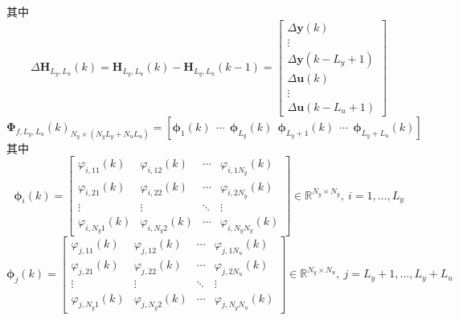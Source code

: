     其中
    \begin{equation}
    \Delta \boldsymbol{H}_{L_y,L_u}(k) = \boldsymbol{H}_{L_y,L_u}(k) - \boldsymbol{H}_{L_y,L_u}(k - 1) = \begin{bmatrix}
    \Delta \boldsymbol{y}(k) \\
    \vdots \\
    \Delta \boldsymbol{y}(k - L_y + 1) \\
    \Delta \boldsymbol{u}(k) \\
    \vdots \\
    \Delta \boldsymbol{u}(k - L_u + 1)
    \end{bmatrix}
    \label{eq:delta_H}
    \end{equation}
    \begin{equation}
    \boldsymbol{\Phi}_{f,L_y,L_u}(k)_{N_y \times (N_y L_y + N_u L_u)} = \left[ \boldsymbol{\phi}_1(k)\ \ \cdots\ \ \boldsymbol{\phi}_{L_y}(k)\ \ \boldsymbol{\phi}_{L_y+1}(k)\ \ \cdots\ \ \boldsymbol{\phi}_{L_y+L_u}(k) \right]
    \label{eq:phi_matrix}
    \end{equation}
    其中
    \begin{equation}
    \boldsymbol{\phi}_i(k) = \begin{bmatrix}
    \varphi_{i,11}(k) & \varphi_{i,12}(k) & \cdots & \varphi_{i,1N_y}(k) \\
    \varphi_{i,21}(k) & \varphi_{i,22}(k) & \cdots & \varphi_{i,2N_y}(k) \\
    \vdots & \vdots & \ddots & \vdots \\
    \varphi_{i,N_y 1}(k) & \varphi_{i,N_y 2}(k) & \cdots & \varphi_{i,N_y N_y}(k)
    \end{bmatrix} \in \mathbb{R}^{N_y \times N_y},\ i = 1,\dots,L_y
    \label{eq:phi_i}
    \end{equation}
    \begin{equation}
    \boldsymbol{\phi}_j(k) = \begin{bmatrix}
    \varphi_{j,11}(k) & \varphi_{j,12}(k) & \cdots & \varphi_{j,1N_u}(k) \\
    \varphi_{j,21}(k) & \varphi_{j,22}(k) & \cdots & \varphi_{j,2N_u}(k) \\
    \vdots & \vdots & \ddots & \vdots \\
    \varphi_{j,N_y 1}(k) & \varphi_{j,N_y 2}(k) & \cdots & \varphi_{j,N_y N_u}(k)
    \end{bmatrix} \in \mathbb{R}^{N_y \times N_u},\ j = L_y + 1,\dots,L_y + L_u
    \label{eq:phi_j}
    \end{equation}

